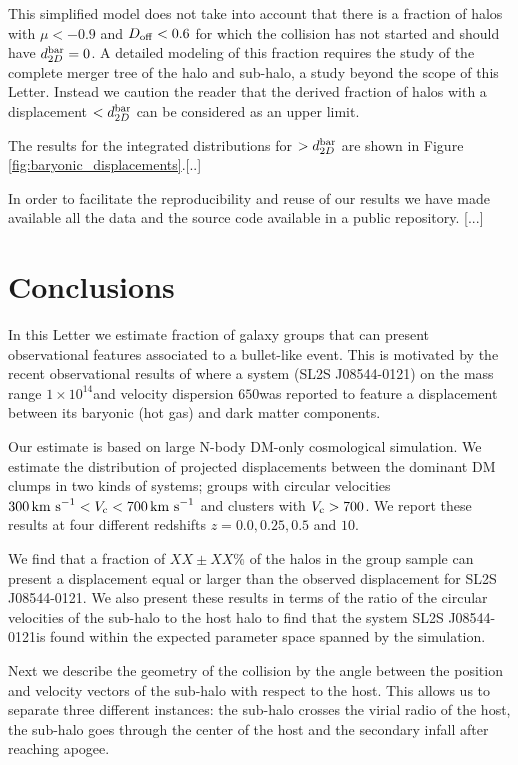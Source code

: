 \documentclass{emulateapj}
\newcommand{\hMsun}{{\ifmmode{h^{-1}{\rm {M_{\odot}}}}\else{$h^{-1}{\rm{M_{\odot}}}$}\fi}}
\newcommand{\kms}{{\ifmmode{{\mathrm{\,km\ s}^{-1}}}\else{\,km~s$^{-1}$}\fi}}
\newcommand{\bullg}{SL2S J08544-0121}
\begin{document}
This simplified model does not take into account that there is a
fraction of halos with $\mu<-0.9$ and $D_{\rm off}<0.6$ for which the
collision has not started and should have $d_{2D}^{\rm bar}=0$. A detailed
modeling of this fraction requires the study of the complete merger
tree of the halo and sub-halo, a study beyond the scope of this
Letter. Instead we caution the reader that the derived fraction of
halos with a displacement $<d_{2D}^{\rm bar}$ can be considered as an
upper limit. 

The results for the integrated distributions for $>d_{2D}^{\rm bar}$
are shown in Figure \ref{fig:baryonic_displacements}.[..]


In order to facilitate the reproducibility and reuse of our results we
have made available all the data and the source code available in a public
repository. [...]  


\section{Conclusions}
\label{sec:conclusions}

In this Letter we estimate fraction of galaxy groups
that can present observational features associated to a
bullet-like event. This is motivated by the recent observational
results of \citep{Gastaldello} where a system (\bullg) on the mass range
$1\times 10^{14}$\hMsun and velocity dispersion $650$\kms was reported
to feature a displacement between its baryonic (hot gas) and dark
matter components. 

Our estimate is based on large N-body DM-only cosmological
simulation. We estimate the distribution of projected displacements
between the dominant DM clumps in two kinds of systems; groups with circular
velocities $300\kms<V_{\rm c}<700\kms$ and clusters with $V_{\rm
  c}>700$\kms. We report these results at four different redshifts
$z=0.0,0.25,0.5$ and $10$.

We find that a fraction of $XX\pm XX\%$ of the halos in the group
sample can present a displacement equal or larger than the observed displacement
for \bullg. We also present these results in terms of the ratio of the
circular velocities of the sub-halo to the host halo to find that the
system \bullg is found within the expected parameter space spanned by
the simulation. 

Next we describe the geometry of the collision by the angle between
the position and velocity vectors of the sub-halo with respect to the
host. This allows us to separate three different instances: the
sub-halo crosses the virial radio of the host, the sub-halo goes
through the center of the host and the secondary
infall after reaching apogee. 
\end{document}
